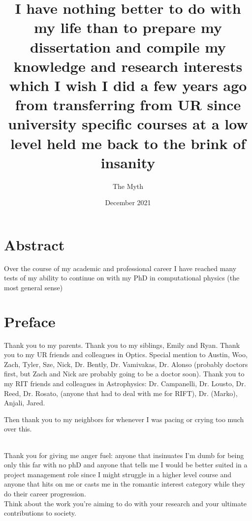 \documentclass{dcthesis}
\title{I have nothing better to do with my life than to prepare my dissertation and compile my knowledge and research interests which I wish I did a few years ago from transferring from UR since university specific courses at a low level held me back to the brink of insanity}
\author{The Myth}
\date{December 2021}
\theoremstyle{definition}
\theoremstyle{remark}
\begin{document}
\frontmatter

\maketitle
\restoregeometry

\chapter*{Abstract}
Over the course of my academic and professional career I have reached many tests of my ability to continue on with my PhD in computational physics (the most general sense) 

\chapter*{Preface}
Thank you to my parents. Thank you to my siblings, Emily and Ryan. Thank you to my UR friends and colleagues in Optics. Special mention to Austin, Woo, Zach, Tyler, Sze, Nick, Dr. Bently, Dr. Vamivakas, Dr. Alonso (probably doctors first, but Zach and Nick are probably going to be a doctor soon). Thank you to my RIT friends and colleagues in Astrophysics: Dr. Campanelli, Dr. Lousto, Dr. Reed, Dr. Rosato, (anyone that had to deal with me for RIFT), Dr. (Marko), Anjali, Jared. 

Then thank you to my neighbors for whenever I was pacing or crying too much over this.  

\\ 
Thank you for giving me anger fuel: anyone that insinuates I'm dumb for being only this far with no phD and anyone that tells me I would be better suited in a project management role since I might struggle in a higher level course and anyone that hits on me or casts me in the romantic interest category while they do their career progression. \\ 

Think about the work you're aiming to do with your research and your ultimate contributions to society. \\
\end{document}
